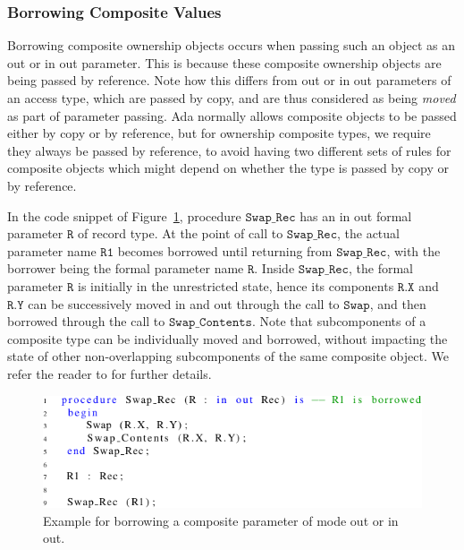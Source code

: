 \documentclass{llncs}
\newcommand\var[1]{\ensuremath{\mathtt{#1}}}
\newcommand{\keyword}[1]{\textsf{#1}}
\begin{document}
\subsubsection{Borrowing Composite Values}
\label{subsubsec:borrowComposite}

Borrowing composite ownership objects occurs when passing such an object as an \keyword{out} or \keyword{in out} parameter. This is because
these composite ownership objects are being passed by reference. Note how this differs from \keyword{out} or \keyword{in out} parameters of an access type, which are passed by copy,
and are thus considered as being \textit{moved} as part of parameter passing. Ada normally allows composite objects to be passed either by copy or by reference, but for ownership composite types, we require they always be passed by reference, to avoid having two different sets of rules for composite objects which might depend on whether the type is passed by copy or by reference.

In the code snippet of Figure~\ref{fig:borrowingComposite}, procedure \var{Swap\_Rec} has an \keyword{in out} formal parameter \var{R} of record type. At the point of
call to \var{Swap\_Rec}, the actual parameter name \var{R1} becomes borrowed until returning from \var{Swap\_Rec}, with the borrower being the formal parameter name \var{R}.  Inside \var{Swap\_Rec}, the formal parameter \var{R} is initially
in the unrestricted state, hence its components \var{R.X} and \var{R.Y} can be successively moved in and out through the call to \var{Swap}, and then borrowed through the call to \var{Swap\_Contents}.
Note that subcomponents of a composite type can be individually moved and borrowed, without impacting the state of other non-overlapping subcomponents of the same composite object.
We refer the reader to \cite{AI2017} for further details.

\begin{figure}[htb!]
\centering
   \includegraphics[]{borrowingComposite}
   \caption{Example for borrowing a composite parameter of mode \keyword{out} or \keyword{in out}.}
   \label{fig:borrowingComposite}
\end{figure}
\end{document}
